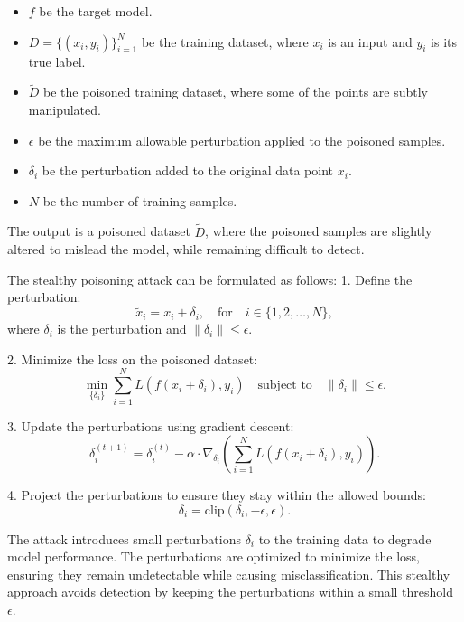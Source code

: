 \begin{itemize}
    \item \( f \) be the target model.
    \item \( D = \{(x_i, y_i)\}_{i=1}^{N} \) be the training dataset, where \( x_i \) is an input and \( y_i \) is its true label.
    \item \( \tilde{D} \) be the poisoned training dataset, where some of the points are subtly manipulated.
    \item \( \epsilon \) be the maximum allowable perturbation applied to the poisoned samples.
    \item \( \delta_i \) be the perturbation added to the original data point \( x_i \).
    \item \( N \) be the number of training samples.
\end{itemize}

The output is a poisoned dataset \( \tilde{D} \), where the poisoned samples are slightly altered to mislead the model, while remaining difficult to detect.

The stealthy poisoning attack can be formulated as follows:
1. Define the perturbation:
   \[
   \tilde{x}_i = x_i + \delta_i, \quad \text{for} \quad i \in \{1, 2, \dots, N\},
   \]
   where \( \delta_i \) is the perturbation and \( \|\delta_i\| \leq \epsilon \).
   
2. Minimize the loss on the poisoned dataset:
   \[
   \min_{\{\delta_i\}} \sum_{i=1}^{N} L(f(x_i + \delta_i), y_i) \quad \text{subject to} \quad \|\delta_i\| \leq \epsilon.
   \]
   
3. Update the perturbations using gradient descent:
   \[
   \delta_i^{(t+1)} = \delta_i^{(t)} - \alpha \cdot \nabla_{\delta_i} \left( \sum_{i=1}^{N} L(f(x_i + \delta_i), y_i) \right).
   \]
   
4. Project the perturbations to ensure they stay within the allowed bounds:
   \[
   \delta_i = \text{clip}(\delta_i, -\epsilon, \epsilon).
   \]

The attack introduces small perturbations \( \delta_i \) to the training data to degrade model performance. The perturbations are optimized to minimize the loss, ensuring they remain undetectable while causing misclassification. This stealthy approach avoids detection by keeping the perturbations within a small threshold \( \epsilon \).
